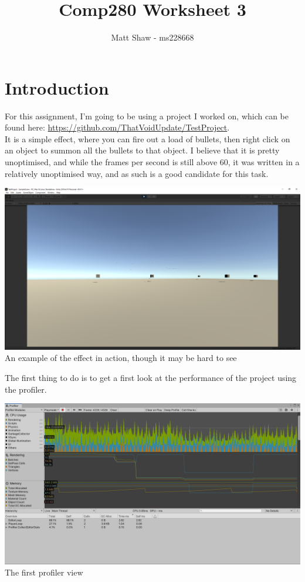 \documentclass{article}
\title{Comp280 Worksheet 3}
\author{Matt Shaw - ms228668}
\begin{document}
\maketitle

\section{Introduction}
For this assignment, I'm going to be using a project I worked on, which can be found here: \url{https://github.com/ThatVoidUpdate/TestProject}. \\
It is a simple effect, where you can fire out a load of bullets, then right click on an object to summon all the bullets to that object. I believe that it is pretty unoptimised, and while the frames per second is still above 60, it was written in a relatively unoptimised way, and as such is a good candidate for this task.
\begin{center}
    \includegraphics[width=\textwidth]{Images/Example.png}\\
    An example of the effect in action, though it may be hard to see\\
\end{center}
The first thing to do is to get a first look at the performance of the project using the profiler.
\begin{center}
    \includegraphics[width=\textwidth]{Images/FirstProfile.png}
    The first profiler view
\end{center}
\end{document}
